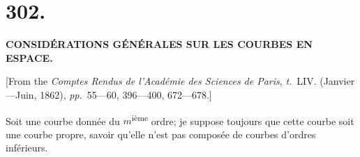 \documentclass[11pt,a4paper]{article}
\newcommand{\tome}{\textit{t.}}
\newcommand{\pages}{\textit{pp.}}
\begin{document}
\clearpage


\section*{302.}

\begin{center}
\textbf{CONSID\'{E}RATIONS G\'{E}N\'{E}RALES SUR LES COURBES EN ESPACE.}
\end{center}

[From the \textit{Comptes Rendus de l'Acad\'{e}mie des Sciences de Paris}, \tome~LIV. (Janvier---Juin, 1862), \pages~55---60, 396---400, 672---678.]

\medskip

Soit une courbe donn\'{e}e du $m$\textsuperscript{i\`{e}me} ordre; je suppose toujours que cette courbe soit une courbe propre, savoir qu'elle n'est pas compos\'{e}e de courbes d'ordres inf\'{e}rieurs.
\end{document}
